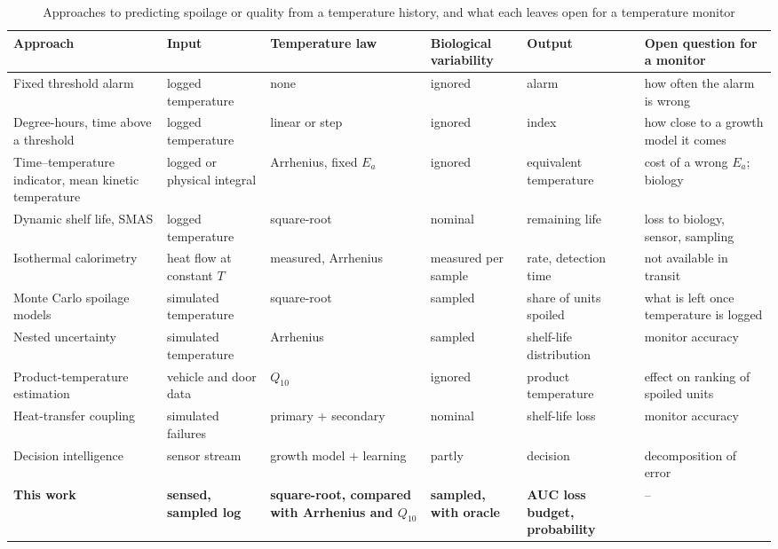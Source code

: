 \begin{table}[!t]\centering\footnotesize
\caption{Approaches to predicting spoilage or quality from a temperature history, and what each leaves open for a temperature monitor}\label{tab:approaches}
\setlength{\tabcolsep}{3.2pt}
\begin{tabular}{@{}p{2.9cm}p{2.3cm}p{2.4cm}p{2.2cm}p{2.1cm}p{4.2cm}@{}}\toprule\rowcolor{dghead}
Approach & Input & Temperature law & Biological variability & Output & Open question for a monitor\\\midrule
Fixed threshold alarm & logged temperature & none & ignored & alarm & how often the alarm is wrong\\
Degree-hours, time above a threshold & logged temperature & linear or step & ignored & index & how close to a growth model it comes\\
Time--temperature indicator, mean kinetic temperature \cite{taoukis1989,kim2020} & logged or physical integral & Arrhenius, fixed $E_a$ & ignored & equivalent temperature & cost of a wrong $E_a$; biology\\
Dynamic shelf life, SMAS \cite{koutsoumanis2001,koutsoumanis2005} & logged temperature & square-root & nominal & remaining life & loss to biology, sensor, sampling\\
Isothermal calorimetry \cite{wadso2011,haman2019,fricke2020} & heat flow at constant $T$ & measured, Arrhenius & measured per sample & rate, detection time & not available in transit\\
Monte Carlo spoilage models \cite{lau2022,buehler2018,qian2023} & simulated temperature & square-root & sampled & share of units spoiled & what is left once temperature is logged\\
Nested uncertainty \cite{giannakourou2020} & simulated temperature & Arrhenius & sampled & shelf-life distribution & monitor accuracy\\
Product-temperature estimation \cite{zou2023} & vehicle and door data & $Q_{10}$ & ignored & product temperature & effect on ranking of spoiled units\\
Heat-transfer coupling \cite{muller2026} & simulated failures & primary + secondary & nominal & shelf-life loss & monitor accuracy\\
Decision intelligence \cite{sofat2026} & sensor stream & growth model + learning & partly & decision & decomposition of error\\
\textbf{This work} & \textbf{sensed, sampled log} & \textbf{square-root, compared with Arrhenius and $Q_{10}$} & \textbf{sampled, with oracle} & \textbf{AUC loss budget, probability} & --\\
\bottomrule\end{tabular}\end{table}



